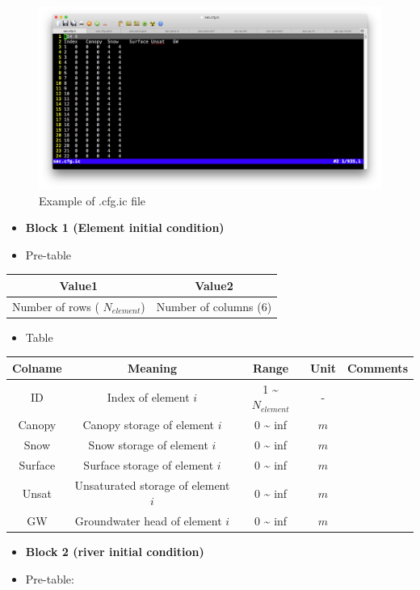 \documentclass[]{scrbook}
\providecommand{\tightlist}{%
  \setlength{\itemsep}{0pt}\setlength{\parskip}{0pt}}
\begin{document}
\begin{figure}
\centering
\includegraphics{Fig/IO/cfg.ic.png}
\caption{Example of .cfg.ic file}
\end{figure}

\begin{itemize}
\item
  \textbf{Block 1 (Element initial condition)}
\item
  Pre-table
\end{itemize}

\begin{longtable}[]{@{}cc@{}}
\toprule
Value1 & Value2\tabularnewline
\midrule
\endhead
Number of rows ( \(N_{element}\)) & Number of columns
(\(6\))\tabularnewline
\bottomrule
\end{longtable}

\begin{itemize}
\tightlist
\item
  Table
\end{itemize}

\begin{longtable}[]{@{}ccccc@{}}
\toprule
Colname & Meaning & Range & Unit & Comments\tabularnewline
\midrule
\endhead
ID & Index of element \(i\) & 1 \textasciitilde{} \(N_{element}\) & -
&\tabularnewline
Canopy & Canopy storage of element \(i\) & 0 \textasciitilde{} inf &
\(m\) &\tabularnewline
Snow & Snow storage of element \(i\) & 0 \textasciitilde{} inf & \(m\)
&\tabularnewline
Surface & Surface storage of element \(i\) & 0 \textasciitilde{} inf &
\(m\) &\tabularnewline
Unsat & Unsaturated storage of element \(i\) & 0 \textasciitilde{} inf &
\(m\) &\tabularnewline
GW & Groundwater head of element \(i\) & 0 \textasciitilde{} inf & \(m\)
&\tabularnewline
\bottomrule
\end{longtable}

\begin{itemize}
\item
  \textbf{Block 2 (river initial condition)}
\item
  Pre-table:
\end{itemize}
\end{document}
